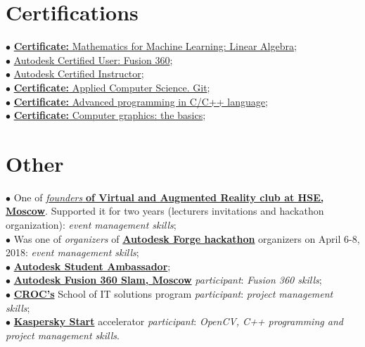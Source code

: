 \documentclass[]{cv-class}
\begin{document}
\begin{minipage}[t]{0.64\textwidth}
\smallSeparator{0.4pt}
\section{Certifications}
    \textcolor{bullet_col}{$\bullet$} \href{https://www.coursera.org/account/accomplishments/certificate/APDHC473Q5H7}{\textbf{Certificate:} Mathematics for Machine Learning: Linear Algebra}; \\
    \textcolor{bullet_col}{$\bullet$} \href{https://www.youracclaim.com/badges/e136c126-c834-408b-b380-beaa949e9180/public_url}{Autodesk Certified User: Fusion 360}; \\
    \textcolor{bullet_col}{$\bullet$} \href{https://www.youracclaim.com/badges/c0436850-b62e-45b4-95fa-6f1b49ca56b6/public_url}{Autodesk Certified Instructor}; \\
    \textcolor{bullet_col}{$\bullet$} \href{https://stepik.org/certificate/86b5b40faf74372730b30f98272ef8a9640ad069.pdf}{\textbf{Certificate:} Applied Computer Science. Git}; \\
    \textcolor{bullet_col}{$\bullet$} \href{https://stepik.org/certificate/93a178ba1662133d84ddb47bed17106eb4a4c8b2.pdf}{\textbf{Certificate:} Advanced programming in C/C++ language}; \\
    \textcolor{bullet_col}{$\bullet$} \href{https://stepik.org/certificate/ffb76dc11c287a0219ffb3e5aee43d2a104bcbb6.pdf}{\textbf{Certificate:} Computer graphics: the basics}; \\
    
\smallSeparator{0.4pt}
\section{Other}
    \textcolor{bullet_col}{$\bullet$} One of \href{http://family.hse.ru/stud/view/391}{\textit{founders} \textbf{of Virtual and Augmented Reality club at HSE, Moscow}}. Supported it for two years (lecturers invitations and hackathon organization): \textit{event management skills}; \\
    \textcolor{bullet_col}{$\bullet$} Was one of \textit{organizers} of \href{https://www.hse.ru/ba/am/news/218387792.html}{\textbf{Autodesk Forge hackathon}} organizers on April 6-8, 2018: \textit{event management skills}; \\
    \textcolor{bullet_col}{$\bullet$} \href{https://academy.autodesk.com/users/n1kkys}{\textbf{Autodesk Student Ambassador}}; \\
    \textcolor{bullet_col}{$\bullet$} \href{https://youtu.be/k5R8RdXaOq4}{\textbf{Autodesk Fusion 360 Slam, Moscow}} \textit{participant}: \textit{Fusion 360 skills}; \\
    \textcolor{bullet_col}{$\bullet$} \href{https://www.croc.ru/eng/}{\textbf{CROC's}} School of IT solutions program \textit{participant}: \textit{project management skills}; \\
    \textcolor{bullet_col}{$\bullet$} \href{https://kasperskystart.com}{\textbf{Kaspersky Start}} accelerator \textit{participant}: \textit{OpenCV, C++ programming and project management skills}.

\end{minipage}
\end{document}
